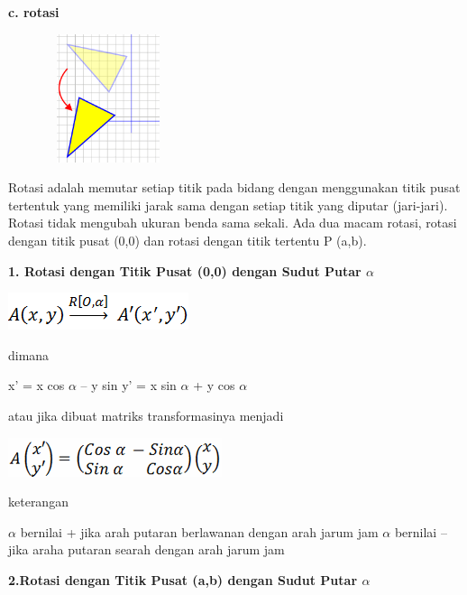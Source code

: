 \documentclass[11pt,fleqn]{book} %
\begin{document}
\newpage
\noindent \textbf{c. rotasi}

\begin{center}
	\noindent \includegraphics*[width=2.32in, height=1.48in, keepaspectratio=false, trim=0.00in 0.11in 0.00in 0.00in]{Pictures/5.PNG}
\end{center}
\noindent 
Rotasi adalah memutar setiap titik pada bidang dengan menggunakan titik pusat tertentuk yang memiliki jarak sama dengan setiap titik yang diputar (jari-jari). Rotasi tidak mengubah ukuran benda sama sekali. Ada dua macam rotasi, rotasi dengan titik pusat (0,0) dan rotasi dengan titik tertentu P (a,b).

\noindent \textbf{1. Rotasi dengan Titik Pusat (0,0) dengan Sudut Putar $\alpha$}
\begin{center}
\includegraphics{Pictures/6.PNG}\\
\end{center}

\noindent
dimana

\noindent x’ = x cos $\alpha$ – y sin
\noindent y’ = x sin $\alpha$ + y cos $\alpha$

atau jika dibuat matriks transformasinya menjadi

\noindent
\begin{center}
\includegraphics{Pictures/7.PNG}\\
\end{center}

\noindent
keterangan

\noindent $\alpha$  bernilai + jika arah putaran berlawanan dengan arah jarum jam
\noindent $\alpha$ bernilai – jika araha putaran searah dengan arah jarum jam


\noindent \textbf{2.Rotasi dengan Titik Pusat (a,b) dengan Sudut Putar $\alpha$}
\end{document}
